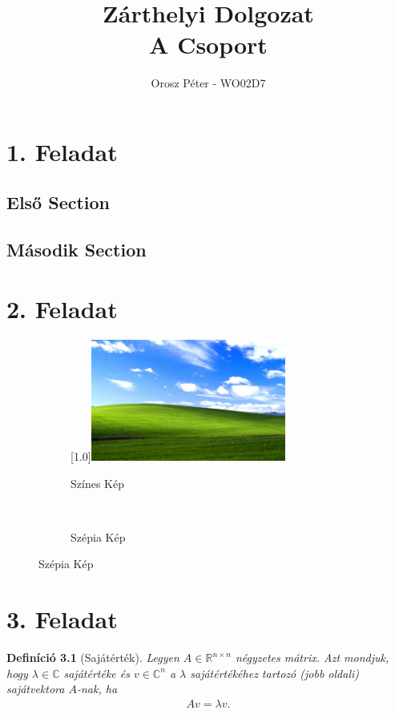 \documentclass[11pt]{book}
\title{Zárthelyi Dolgozat\\ {\small A Csoport}}
\author{Orosz Péter - WO02D7}
\newtheorem{definicio}{Definíció}
\begin{document}
	\maketitle
	\newpage
	\chapter{1. Feladat}
		\section{Első Section}
			\lipsum
		\section{Második Section}
			\lipsum
			
	\chapter{2. Feladat}
		\lipsum[1-4]
		\begin{figure}
			\centering
			\caption{Színes és Szépia Képek}
			\begin{subfigure}{5cm}
				\centering
				\caption{Színes Kép}
				\scalebox{0.5}[1.0]{\includegraphics[height=4cm]{szines.jpg}}
			\end{subfigure}\\
			\begin{subfigure}{5cm}
				\centering
				\caption{Szépia Kép}
			\end{subfigure}
		\end{figure}
		\lipsum
	
	\chapter{3. Feladat}
		\begin{definicio}[Sajátérték]
			Legyen $A \in \mathbb{R}^{n \times n}$ négyzetes mátrix. Azt mondjuk, hogy $\lambda \in \mathbb{C}$ sajátértéke és $v \in \mathbb{C}^n$ a $\lambda$ sajátértékéhez tartozó (jobb oldali) sajátvektora $A$-nak, ha 
			\begin{gather}
				Av=\lambda v.
			\end{gather}
		\end{definicio}
		
\end{document}
